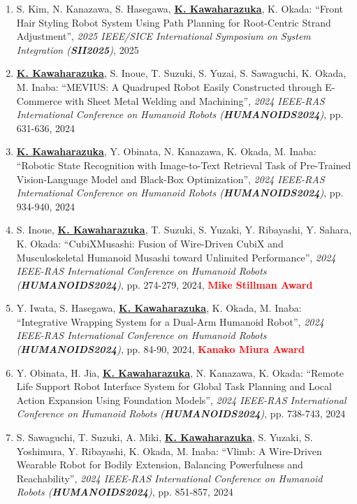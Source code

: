 \documentclass[letterpaper]{article}
\begin{document}
\begin{enumerate}
\item S. Kim, N. Kanazawa, S. Hasegawa, \underline{\textbf{K. Kawaharazuka}}, K. Okada: ``Front Hair Styling Robot System Using Path Planning for Root-Centric Strand Adjustment'', \textit{2025 IEEE/SICE International Symposium on System Integration (\textit{\textbf{SII2025}})}, 2025
\item \underline{\textbf{K. Kawaharazuka}}, S. Inoue, T. Suzuki, S. Yuzai, S. Sawaguchi, K. Okada, M. Inaba: ``MEVIUS: A Quadruped Robot Easily Constructed through E-Commerce with Sheet Metal Welding and Machining'', \textit{2024 IEEE-RAS International Conference on Humanoid Robots (\textit{\textbf{HUMANOIDS2024}})}, pp. 631-636, 2024
\item \underline{\textbf{K. Kawaharazuka}}, Y. Obinata, N. Kanazawa, K. Okada, M. Inaba: ``Robotic State Recognition with Image-to-Text Retrieval Task of Pre-Trained Vision-Language Model and Black-Box Optimization'', \textit{2024 IEEE-RAS International Conference on Humanoid Robots (\textit{\textbf{HUMANOIDS2024}})}, pp. 934-940, 2024
\item S. Inoue, \underline{\textbf{K. Kawaharazuka}}, T. Suzuki, S. Yuzaki, Y. Ribayashi, Y. Sahara, K. Okada: ``CubiXMusashi: Fusion of Wire-Driven CubiX and Musculoskeletal Humanoid Musashi toward Unlimited Performance'', \textit{2024 IEEE-RAS International Conference on Humanoid Robots (\textit{\textbf{HUMANOIDS2024}})}, pp. 274-279, 2024, \textbf{\textcolor{red}{Mike Stillman Award}}
\item Y. Iwata, S. Hasegawa, \underline{\textbf{K. Kawaharazuka}}, K. Okada, M. Inaba: ``Integrative Wrapping System for a Dual-Arm Humanoid Robot'', \textit{2024 IEEE-RAS International Conference on Humanoid Robots (\textit{\textbf{HUMANOIDS2024}})}, pp. 84-90, 2024, \textbf{\textcolor{red}{Kanako Miura Award}}
\item Y. Obinata, H. Jia, \underline{\textbf{K. Kawaharazuka}}, N. Kanazawa, K. Okada: ``Remote Life Support Robot Interface System for Global Task Planning and Local Action Expansion Using Foundation Models'', \textit{2024 IEEE-RAS International Conference on Humanoid Robots (\textit{\textbf{HUMANOIDS2024}})}, pp. 738-743, 2024
\item S. Sawaguchi, T. Suzuki, A. Miki, \underline{\textbf{K. Kawaharazuka}}, S. Yuzaki, S. Yoshimura, Y. Ribayashi, K. Okada, M. Inaba: ``Vlimb: A Wire-Driven Wearable Robot for Bodily Extension, Balancing Powerfulness and Reachability'', \textit{2024 IEEE-RAS International Conference on Humanoid Robots (\textit{\textbf{HUMANOIDS2024}})}, pp. 851-857, 2024

\end{enumerate}
\end{document}
